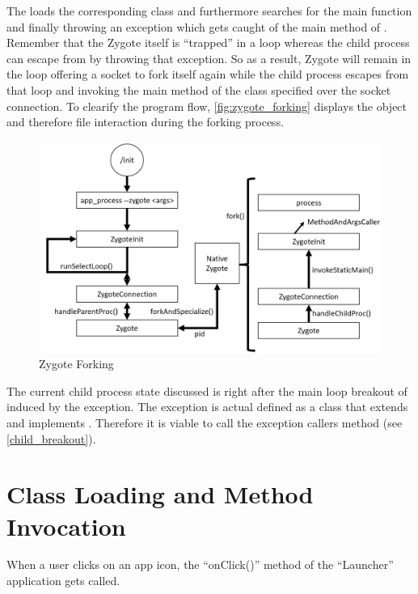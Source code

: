 The  loads the corresponding class and furthermore
searches for the main function and finally throwing an
 exception which gets caught of the main method of . Remember that the Zygote itself is ``trapped'' in a loop whereas the child process can escape from by throwing that exception.
So as a result, Zygote will remain in the loop offering a socket to fork
itself again while the child process escapes from that loop and
invoking the main method of the class specified over the socket
connection.
To clearify the program flow, \autoref{fig:zygote_forking} displays
the object and therefore file interaction during the forking process.

\begin{figure}[htb]
  \centering
  \includegraphics[width={\textwidth}]{figures/zygote_forking}
  \caption[Zygote Forking]{Zygote Forking}
  \label{fig:zygote_forking}
\end{figure}


The current child process state discussed is right after the main loop
breakout of  induced by the exception. The exception
is actual defined as a class that extends  and implements
. Therefore it is viable to call the exception callers
 method (see \autoref{child_breakout}).




\section{Class Loading and Method Invocation}\label{cl_loading}




When a user clicks on an app icon, the ``onClick()'' method
of the ``Launcher'' application gets called.




